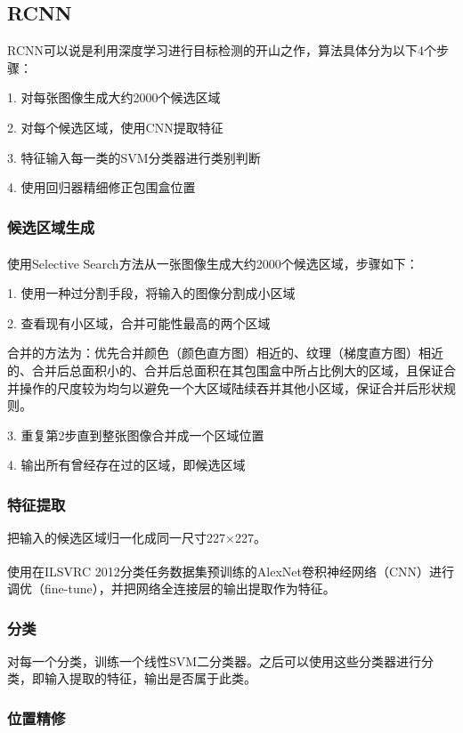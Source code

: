 \documentclass[a4paper, 12pt, UTF8]{article}
\begin{document}
\subsection{RCNN}

RCNN可以说是利用深度学习进行目标检测的开山之作，算法具体分为以下4个步骤：

1. 对每张图像生成大约2000个候选区域

2. 对每个候选区域，使用CNN提取特征

3. 特征输入每一类的SVM分类器进行类别判断

4. 使用回归器精细修正包围盒位置 

\subsubsection{候选区域生成}

使用Selective Search\textsuperscript{\cite{ref7}}方法从一张图像生成大约2000个候选区域，步骤如下：

1. 使用一种过分割手段，将输入的图像分割成小区域

2. 查看现有小区域，合并可能性最高的两个区域

合并的方法为：优先合并颜色（颜色直方图）相近的、纹理（梯度直方图）相近的、合并后总面积小的、合并后总面积在其包围盒中所占比例大的区域，且保证合并操作的尺度较为均匀以避免一个大区域陆续吞并其他小区域，保证合并后形状规则。

3. 重复第2步直到整张图像合并成一个区域位置

4. 输出所有曾经存在过的区域，即候选区域

\subsubsection{特征提取}

把输入的候选区域归一化成同一尺寸227×227。

使用在ILSVRC 2012\textsuperscript{\cite{ref8}}分类任务数据集预训练的AlexNet\textsuperscript{\cite{ref9}}卷积神经网络（CNN）进行调优（fine-tune），并把网络全连接层的输出提取作为特征。

\subsubsection{分类}

对每一个分类，训练一个线性SVM二分类器。之后可以使用这些分类器进行分类，即输入提取的特征，输出是否属于此类。

\subsubsection{位置精修}
\end{document}
